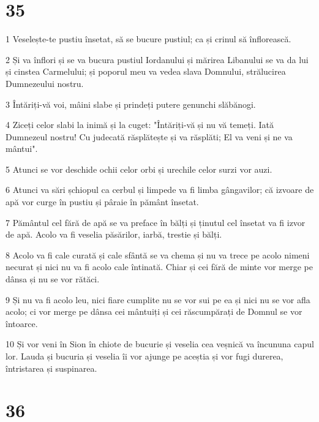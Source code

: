 \chapter{35}

\par 1 Veselește-te pustiu însetat, să se bucure pustiul; ca și crinul să înflorească.
\par 2 Și va înflori și se va bucura pustiul Iordanului și mărirea Libanului se va da lui și cinstea Carmelului; și poporul meu va vedea slava Domnului, strălucirea Dumnezeului nostru.
\par 3 Întăriți-vă voi, mâini slabe și prindeți putere genunchi slăbănogi.
\par 4 Ziceți celor slabi la inimă și la cuget: "Întăriți-vă și nu vă temeți. Iată Dumnezeul nostru! Cu judecată răsplătește și va răsplăti; El va veni și ne va mântui".
\par 5 Atunci se vor deschide ochii celor orbi și urechile celor surzi vor auzi.
\par 6 Atunci va sări șchiopul ca cerbul și limpede va fi limba gângavilor; că izvoare de apă vor curge în pustiu și pâraie în pământ însetat.
\par 7 Pământul cel fără de apă se va preface în bălți și ținutul cel însetat va fi izvor de apă. Acolo va fi veselia păsărilor, iarbă, trestie și bălți.
\par 8 Acolo va fi cale curată și cale sfântă se va chema și nu va trece pe acolo nimeni necurat și nici nu va fi acolo cale întinată. Chiar și cei fără de minte vor merge pe dânsa și nu se vor rătăci.
\par 9 Și nu va fi acolo leu, nici fiare cumplite nu se vor sui pe ea și nici nu se vor afla acolo; ci vor merge pe dânsa cei mântuiți și cei răscumpărați de Domnul se vor întoarce.
\par 10 Și vor veni în Sion în chiote de bucurie și veselia cea veșnică va încununa capul lor. Lauda și bucuria și veselia îi vor ajunge pe aceștia și vor fugi durerea, întristarea și suspinarea.

\chapter{36}

